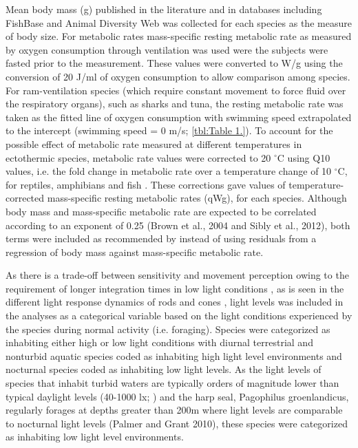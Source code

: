 Mean body mass (g) published in the literature and in databases including FishBase \citep{froese2012fishbase} and Animal Diversity Web \citep{myers2006animal} was collected for each species as the measure of body size. For metabolic rates mass-specific resting metabolic rate as measured by oxygen consumption through ventilation  was used were the subjects were fasted prior to the measurement. These values were converted to W/g using the conversion of 20 J/ml of oxygen consumption \citep{makarieva2008mean} to allow comparison among species. For ram-ventilation species (which require constant movement to force fluid over the respiratory organs), such as sharks and tuna, the resting metabolic rate was taken as the fitted line of oxygen consumption with swimming speed extrapolated to the intercept (swimming speed = 0 m/s; \ref{tbl:Table 1.}). To account for the possible effect of metabolic rate measured at different temperatures in ectothermic species, metabolic rate values were corrected to 20 $^{\circ}$C using Q10 values, i.e. the fold change in metabolic rate over a temperature change of 10 $^{\circ}$C, for reptiles, amphibians and fish \citep{white2006scaling}. These corrections gave values of temperature-corrected mass-specific resting metabolic rates (qWg), for each species. Although body mass and mass-specific metabolic rate are expected to be correlated according to an exponent of 0.25 \citep{brown2004, sibly2012metabolic} (Brown et al., 2004 and Sibly et al., 2012), both terms were included as recommended by \citep{freckleton2009seven} instead of using residuals from a regression of body mass against mass-specific metabolic rate.

As there is a trade-off between sensitivity and movement perception owing to the requirement of longer integration times in low light conditions \citep{tansley1965vision}, as is seen in the different light response dynamics of rods and cones \citep{rubene2010presence}, light levels was included in the analyses as a categorical variable based on the light conditions experienced by the species during normal activity (i.e. foraging). Species were categorized as inhabiting either high or low light conditions with diurnal terrestrial and nonturbid aquatic species coded as inhabiting high light level environments and nocturnal species coded as inhabiting low light levels. As the light levels of species that inhabit turbid waters are typically orders of magnitude lower than typical daylight levels (40-1000 lx; \citealt{ali1985vision,palmer2010art,kreysing2012photonic}) and the harp seal, Pagophilus groenlandicus, regularly forages at depths greater than 200m \citep{folkow2004distribution} where light levels are comparable to nocturnal light levels (Palmer and Grant 2010), these species were categorized as inhabiting low light level environments.


